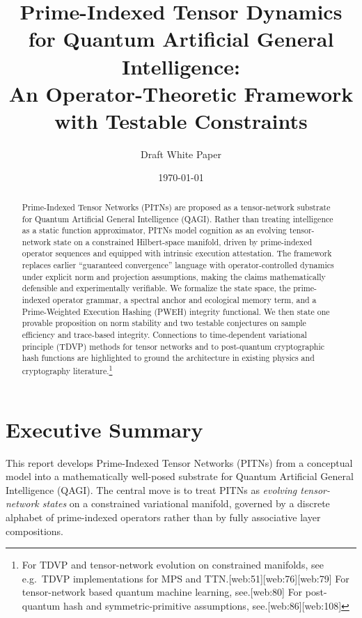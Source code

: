 \documentclass[11pt]{article}
\title{Prime-Indexed Tensor Dynamics for Quantum Artificial General Intelligence:\\
An Operator-Theoretic Framework with Testable Constraints}
\author{Draft White Paper}
\date{\today}
\begin{document}
\maketitle

\begin{abstract}
Prime-Indexed Tensor Networks (PITNs) are proposed as a tensor-network substrate for Quantum Artificial General Intelligence (QAGI). Rather than treating intelligence as a static function approximator, PITNs model cognition as an evolving tensor-network state on a constrained Hilbert-space manifold, driven by prime-indexed operator sequences and equipped with intrinsic execution attestation. The framework replaces earlier ``guaranteed convergence'' language with operator-controlled dynamics under explicit norm and projection assumptions, making the claims mathematically defensible and experimentally verifiable. We formalize the state space, the prime-indexed operator grammar, a spectral anchor and ecological memory term, and a Prime-Weighted Execution Hashing (PWEH) integrity functional. We then state one provable proposition on norm stability and two testable conjectures on sample efficiency and trace-based integrity. Connections to time-dependent variational principle (TDVP) methods for tensor networks and to post-quantum cryptographic hash functions are highlighted to ground the architecture in existing physics and cryptography literature.\footnote{For TDVP and tensor-network evolution on constrained manifolds, see e.g.\ TDVP implementations for MPS and TTN.[web:51][web:76][web:79] For tensor-network based quantum machine learning, see.[web:80] For post-quantum hash and symmetric-primitive assumptions, see.[web:86][web:108]} 
\end{abstract}
\newpage
\tableofcontents
\newpage
\section{Executive Summary}

This report develops Prime-Indexed Tensor Networks (PITNs) from a conceptual model into a mathematically well-posed substrate for Quantum Artificial General Intelligence (QAGI). The central move is to treat PITNs as \emph{evolving tensor-network states} on a constrained variational manifold, governed by a discrete alphabet of prime-indexed operators rather than by fully associative layer compositions.

\medskip
\end{document}
